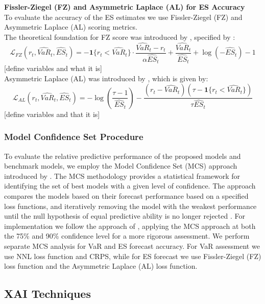 \textbf{Fissler-Ziegel (FZ) and Asymmetric Laplace (AL) for ES Accuracy} \\
To evaluate the accuracy of the ES estimates we use Fissler-Ziegel (FZ) and Asymmetric Laplace (AL) scoring metrics.  \\

The theoretical foundation for FZ score was introduced by \textcite{fissler2016fz}, specified by \textcite{Patton2019}:
\begin{equation}
\mathcal{L}_{FZ}(r_t, \widehat{VaR}_t, \widehat{ES}_t) = 
- \mathbf{1}\{r_t < \widehat{VaR}_t\} \cdot \frac{\widehat{VaR}_t - r_t}{\alpha \widehat{ES}_t} 
+ \frac{\widehat{VaR}_t}{\widehat{ES}_t} 
+ \log(-\widehat{ES}_t) - 1
\end{equation}
[define variables and what it is] \\

Asymmetric Laplace (AL) was introduced by \textcite{Taylor2017}, which is given by:
\begin{equation}
\mathcal{L}_{AL}(r_t, \widehat{VaR}_t, \widehat{ES}_t) = 
- \log \left( \frac{\tau - 1}{\widehat{ES}_t} \right) 
- \frac{(r_t - \widehat{VaR}_t)(\tau - \mathbf{1}\{r_t < \widehat{VaR}_t\})}{\tau \widehat{ES}_t}
\end{equation}
[define variables and that it is] \\

\subsubsection{Model Confidence Set Procedure} 
\label{sec:model_confidence_set_procedure}
To evaluate the relative predictive performance of the proposed models and benchmark models, we employ the Model Confidence Set (MCS) approach introduced by \textcite{hansen2011mcs}. The MCS methodology provides a statistical framework for identifying the set of best models with a given level of confidence. The approach compares the models based on their forecast performance based on a specified loss functions, and iteratively removing the model with the weakest performance until the null hypothesis of equal predictive ability is no longer rejected \parencite{hansen2011mcs}. For implementation we follow the approach of \textcite{marchese2020mcs}, applying the MCS approach at both the 75\% and 90\% confidence level for a more rigorous assessment. We perform separate MCS analysis for VaR and ES forecast accuracy. For VaR assessment we use NNL loss function and CRPS, while for ES forecast we use Fissler-Ziegel (FZ) loss function and the Asymmetric Laplace (AL) loss function. 

\subsection{XAI Techniques}
